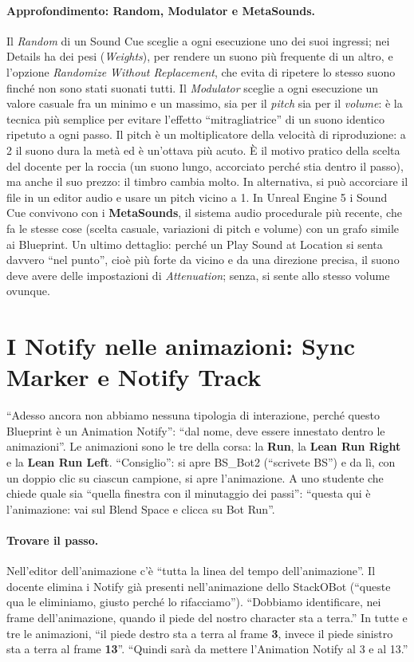 \paragraph{Approfondimento: Random, Modulator e MetaSounds.} Il \emph{Random} di un Sound
Cue sceglie a ogni esecuzione uno dei suoi ingressi; nei Details ha dei pesi
(\emph{Weights}), per rendere un suono più frequente di un altro, e l'opzione
\emph{Randomize Without Replacement}, che evita di ripetere lo stesso suono finché non sono
stati suonati tutti. Il \emph{Modulator} sceglie a ogni esecuzione un valore casuale fra un
minimo e un massimo, sia per il \emph{pitch} sia per il \emph{volume}: è la tecnica più
semplice per evitare l'effetto ``mitragliatrice'' di un suono identico ripetuto a ogni
passo. Il pitch è un moltiplicatore della velocità di riproduzione: a 2 il suono dura la
metà ed è un'ottava più acuto. È il motivo pratico della scelta del docente per la roccia
(un suono lungo, accorciato perché stia dentro il passo), ma anche il suo prezzo: il
timbro cambia molto. In alternativa, si può accorciare il file in un editor audio e usare
un pitch vicino a 1. In Unreal Engine 5 i Sound Cue convivono con i \textbf{MetaSounds},
il sistema audio procedurale più recente, che fa le stesse cose (scelta casuale, variazioni
di pitch e volume) con un grafo simile ai Blueprint. Un ultimo dettaglio: perché un Play
Sound at Location si senta davvero ``nel punto'', cioè più forte da vicino e da una
direzione precisa, il suono deve avere delle impostazioni di \emph{Attenuation}; senza, si
sente allo stesso volume ovunque.

\section{I Notify nelle animazioni: Sync Marker e Notify Track}
\label{ue10:sec:track}

``Adesso ancora non abbiamo nessuna tipologia di interazione, perché questo Blueprint è un
Animation Notify'': ``dal nome, deve essere innestato dentro le animazioni''. Le animazioni
sono le tre della corsa: la \textbf{Run}, la \textbf{Lean Run Right} e la \textbf{Lean Run
Left}. ``Consiglio'': si apre BS\_Bot2 (``scrivete BS'') e da lì, con un doppio clic su
ciascun campione, si apre l'animazione. A uno studente che chiede quale sia ``quella
finestra con il minutaggio dei passi'': ``questa qui è l'animazione: vai sul Blend Space e
clicca su Bot Run''.

\paragraph{Trovare il passo.} Nell'editor dell'animazione c'è ``tutta la linea del tempo
dell'animazione''. Il docente elimina i Notify già presenti nell'animazione dello StackOBot
(``queste qua le eliminiamo, giusto perché lo rifacciamo''). ``Dobbiamo identificare, nei
frame dell'animazione, quando il piede del nostro character sta a terra.'' In tutte e tre
le animazioni, ``il piede destro sta a terra al frame \textbf{3}, invece il piede sinistro
sta a terra al frame \textbf{13}''. ``Quindi sarà da mettere l'Animation Notify al 3 e al
13.''


